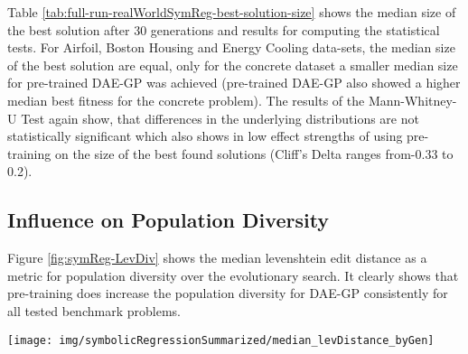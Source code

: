 \documentclass[
  11pt,
]{article}
\let\origfigure\figure
\let\endorigfigure\endfigure
\renewenvironment{figure}[1][2] {
    \expandafter\origfigure\expandafter[H]
} {
    \endorigfigure
}
\begin{document}
Table \ref{tab:full-run-realWorldSymReg-best-solution-size} shows the median size of the best solution after 30 generations and results for computing the statistical tests.
For Airfoil, Boston Housing and Energy Cooling data-sets, the median size of the best solution are equal, only for the concrete dataset a smaller median size for pre-trained DAE-GP was achieved (pre-trained DAE-GP also showed a higher median best fitness for the concrete problem).
The results of the Mann-Whitney-U Test again show, that differences in the underlying distributions are not statistically significant which also shows in low effect strengths of using pre-training on the size of the best found solutions (Cliff's Delta ranges from-0.33 to 0.2).

\hypertarget{influence-on-population-diversity}{%
\subsection{Influence on Population Diversity}\label{influence-on-population-diversity}}

Figure \ref{fig:symReg-LevDiv} shows the median levenshtein edit distance as a metric for population diversity over the evolutionary search.
It clearly shows that pre-training does increase the population diversity for DAE-GP consistently for all tested benchmark problems.

\begin{figure}[c]

{\centering \texttt{[image: img/symbolicRegressionSummarized/median\_levDistance\_byGen]} 

}

\caption{Population Diversity over 30 Generations - Real World Symbolic Regression}\label{fig:symReg-LevDiv}
\end{figure}
\end{document}
